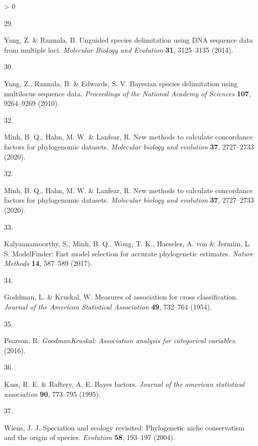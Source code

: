 \documentclass[
  11pt,
]{article}
\newlength{\cslhangindent}
\newlength{\csllabelwidth}
\newenvironment{CSLReferences}[2] %
 {%
  \setlength{\parindent}{0pt}
  \ifodd #1 \everypar{\setlength{\hangindent}{\cslhangindent}}\ignorespaces\fi
  \ifnum #2 > 0
  \setlength{\parskip}{#2\baselineskip}
  \fi
 }%
 {}
\newcommand{\CSLLeftMargin}[1]{\parbox[t]{\csllabelwidth}{#1}}
\newcommand{\CSLRightInline}[1]{\parbox[t]{\linewidth - \csllabelwidth}{#1}\break}
\begin{document}
\begin{CSLReferences}{0}{0}
\leavevmode\hypertarget{ref-yang2014unguided}{}%
\CSLLeftMargin{29. }
\CSLRightInline{Yang, Z. \& Rannala, B. Unguided species delimitation using DNA sequence data from multiple loci. \emph{Molecular Biology and Evolution} \textbf{31}, 3125--3135 (2014).}

\leavevmode\hypertarget{ref-Yang:2010jz}{}%
\CSLLeftMargin{30. }
\CSLRightInline{Yang, Z., Rannala, B. \& Edwards, S. V. {Bayesian species delimitation using multilocus sequence data}. \emph{Proceedings of the National Academy of Sciences} \textbf{107}, 9264--9269 (2010).}

\leavevmode\hypertarget{ref-minh2020new}{}%
\CSLLeftMargin{32. }
\CSLRightInline{Minh, B. Q., Hahn, M. W. \& Lanfear, R. New methods to calculate concordance factors for phylogenomic datasets. \emph{Molecular biology and evolution} \textbf{37}, 2727--2733 (2020).}

\leavevmode\hypertarget{ref-minh2020new}{}%
\CSLLeftMargin{32. }
\CSLRightInline{Minh, B. Q., Hahn, M. W. \& Lanfear, R. New methods to calculate concordance factors for phylogenomic datasets. \emph{Molecular biology and evolution} \textbf{37}, 2727--2733 (2020).}

\leavevmode\hypertarget{ref-kalyaanamoorthy2017modelfinder}{}%
\CSLLeftMargin{33. }
\CSLRightInline{Kalyaanamoorthy, S., Minh, B. Q., Wong, T. K., Haeseler, A. von \& Jermiin, L. S. ModelFinder: Fast model selection for accurate phylogenetic estimates. \emph{Nature Methods} \textbf{14}, 587--589 (2017).}

\leavevmode\hypertarget{ref-goddman1954measures}{}%
\CSLLeftMargin{34. }
\CSLRightInline{Goddman, L. \& Kruskal, W. Measures of association for cross classification. \emph{Journal of the American Statistical Association} \textbf{49}, 732--764 (1954).}

\leavevmode\hypertarget{ref-PearsonGKt2016}{}%
\CSLLeftMargin{35. }
\CSLRightInline{Pearson, R. \emph{GoodmanKruskal: Association analysis for categorical variables}. (2016).}

\leavevmode\hypertarget{ref-kass1995bayes}{}%
\CSLLeftMargin{36. }
\CSLRightInline{Kass, R. E. \& Raftery, A. E. Bayes factors. \emph{Journal of the american statistical association} \textbf{90}, 773--795 (1995).}

\leavevmode\hypertarget{ref-wiens2004speciation}{}%
\CSLLeftMargin{37. }
\CSLRightInline{Wiens, J. J. Speciation and ecology revisited: Phylogenetic niche conservatism and the origin of species. \emph{Evolution} \textbf{58}, 193--197 (2004).}


\end{CSLReferences}
\end{document}
